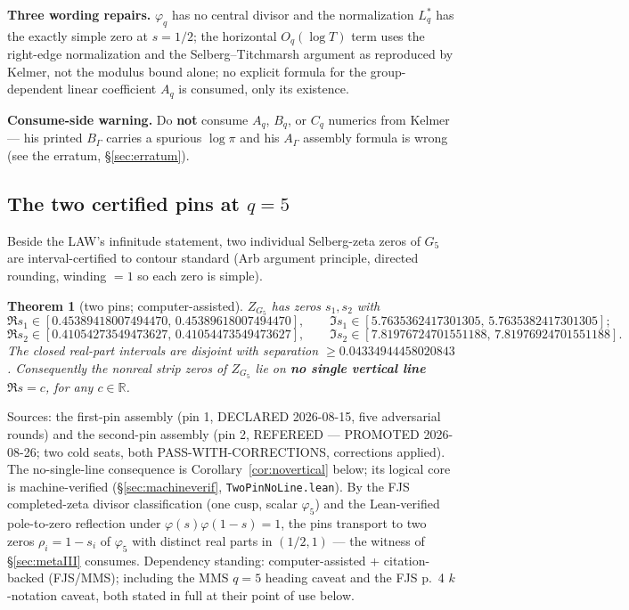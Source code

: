 \documentclass[11pt]{amsart}
\newtheorem{theorem}{Theorem}[section]
\theoremstyle{remark}
\begin{document}
\textbf{Three wording repairs.} $\varphi_q$ has no central divisor and
the normalization $L_q^*$ has the exactly simple zero at $s=1/2$; the
horizontal $O_q(\log T)$ term uses the right-edge normalization and the
Selberg--Titchmarsh argument as reproduced by Kelmer, not the modulus
bound alone; no explicit formula for the group-dependent linear
coefficient $A_q$ is consumed, only its existence.

\textbf{Consume-side warning.} Do \textbf{not} consume $A_q$, $B_q$, or
$C_q$ numerics from Kelmer --- his printed $B_\Gamma$ carries a spurious
$\log\pi$ and his $A_\Gamma$ assembly formula is wrong (see the erratum,
\S\ref{sec:erratum}).

\subsection{The two certified pins at $q=5$}
\label{sec:twopins}

Beside the LAW's infinitude statement, two individual Selberg-zeta zeros
of $G_5$ are interval-certified to contour standard (Arb argument
principle, directed rounding, winding $=1$ so each zero is simple).

\begin{theorem}[two pins; computer-assisted]
\label{thm:twopins}
$Z_{G_5}$ has zeros $s_1, s_2$ with
\[
\Re s_1\in[0.45389418007494470,\,0.45389618007494470], \qquad
\Im s_1\in[5.7635362417301305,\,5.7635382417301305];
\]
\[
\Re s_2\in[0.41054273549473627,\,0.41054473549473627], \qquad
\Im s_2\in[7.81976724701551188,\,7.81976924701551188].
\]
The closed real-part intervals are disjoint with separation
$\ge 0.04334944458020843$. Consequently the nonreal strip zeros of
$Z_{G_5}$ lie on \textbf{no single vertical line} $\Re s=c$, for any
$c\in\mathbb R$.
\end{theorem}

Sources: the first-pin assembly (pin 1, DECLARED 2026-08-15, five
adversarial rounds) and the second-pin assembly (pin 2, REFEREED ---
PROMOTED 2026-08-26; two cold seats, both PASS-WITH-CORRECTIONS,
corrections applied). The no-single-line consequence is
Corollary~\ref{cor:novertical} below; its logical core is
machine-verified (\S\ref{sec:machineverif},
\texttt{TwoPinNoLine.lean}). By the FJS completed-zeta divisor
classification (one cusp, scalar $\varphi_5$) and the Lean-verified
pole-to-zero reflection under $\varphi(s)\varphi(1-s)=1$, the pins
transport to two zeros $\rho_i=1-s_i$ of $\varphi_5$ with distinct real
parts in $(1/2,1)$ --- the witness of \S\ref{sec:metaIII} consumes.
Dependency standing: computer-assisted + citation-backed (FJS/MMS);
including the MMS $q=5$ heading caveat and the FJS p.\ 4 $k$-notation
caveat, both stated in full at their point of use below.
\end{document}
